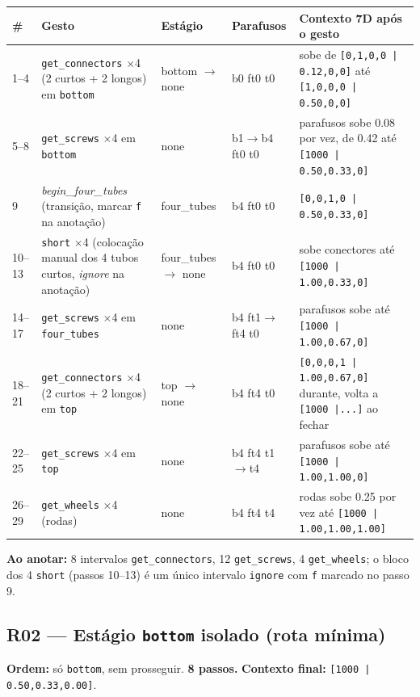 \documentclass[11pt,a4paper]{article}
\begin{document}
\begin{longtable}{p{0.6cm}p{3.1cm}p{2.6cm}p{2.3cm}p{5.5cm}}
\toprule
\textbf{\#} & \textbf{Gesto} & \textbf{Estágio} & \textbf{Parafusos} & \textbf{Contexto 7D após o gesto} \\
\midrule
\endhead
1--4 & \texttt{get\_connectors} $\times$4 (2 curtos + 2 longos) em \texttt{bottom} & bottom $\to$ none & b0 ft0 t0 & sobe de \texttt{[0,1,0,0\,|\,0.12,0,0]} até \texttt{[1,0,0,0\,|\,0.50,0,0]} \\
5--8 & \texttt{get\_screws} $\times$4 em \texttt{bottom} & none & b1$\to$b4 ft0 t0 & parafusos sobe 0.08 por vez, de 0.42 até \texttt{[1000\,|\,0.50,0.33,0]} \\
9 & \textit{begin\_four\_tubes} (transição, marcar \texttt{f} na anotação) & four\_tubes & b4 ft0 t0 & \texttt{[0,0,1,0\,|\,0.50,0.33,0]} \\
10--13 & \texttt{short} $\times$4 (colocação manual dos 4 tubos curtos, \textit{ignore} na anotação) & four\_tubes $\to$ none & b4 ft0 t0 & sobe conectores até \texttt{[1000\,|\,1.00,0.33,0]} \\
14--17 & \texttt{get\_screws} $\times$4 em \texttt{four\_tubes} & none & b4 ft1$\to$ft4 t0 & parafusos sobe até \texttt{[1000\,|\,1.00,0.67,0]} \\
18--21 & \texttt{get\_connectors} $\times$4 (2 curtos + 2 longos) em \texttt{top} & top $\to$ none & b4 ft4 t0 & \texttt{[0,0,0,1\,|\,1.00,0.67,0]} durante, volta a \texttt{[1000\,|...]} ao fechar \\
22--25 & \texttt{get\_screws} $\times$4 em \texttt{top} & none & b4 ft4 t1$\to$t4 & parafusos sobe até \texttt{[1000\,|\,1.00,1.00,0]} \\
26--29 & \texttt{get\_wheels} $\times$4 (rodas) & none & b4 ft4 t4 & rodas sobe 0.25 por vez até \texttt{[1000\,|\,1.00,1.00,1.00]} \\
\bottomrule
\end{longtable}

\textbf{Ao anotar:} 8 intervalos \texttt{get\_connectors}, 12
\texttt{get\_screws}, 4 \texttt{get\_wheels}; o bloco dos 4 \texttt{short}
(passos 10--13) é um único intervalo \texttt{ignore} com \texttt{f} marcado
no passo 9.

\subsection{R02 --- Estágio \texttt{bottom} isolado (rota mínima)}
\label{ap:r02}

\textbf{Ordem:} só \texttt{bottom}, sem prosseguir. \textbf{8 passos.}
\textbf{Contexto final:} \texttt{[1000\,|\,0.50,0.33,0.00]}.
\end{document}
